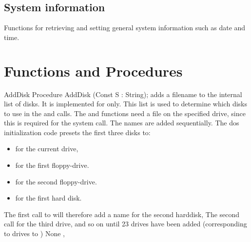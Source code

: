 \subsection{System information}
Functions for retrieving and setting general system information such as date
and time.
\begin{funclist}
\end{funclist}

\section{Functions and Procedures}
\begin{procedure}{AddDisk}
\Declaration
Procedure AddDisk (Const S : String);
\Description
{} adds a filename  to the internal list of disks. It is
implemented for \linux only.
 This list is used to determine which disks to use in the 
and  calls. 
The  and  functions need a file on the 
specified drive, since this is required for the  system call.
The names are added sequentially. The dos
initialization code presets the first three disks to:
\begin{itemize}
\item {} for the current drive, 
\item {} for the first floppy-drive.
\item {} for the second floppy-drive.
\item {} for the first hard disk.
\end{itemize}
The first call to  will therefore add a name for the second
harddisk, The second call for the third drive, and so on until 23 drives
have been added (corresponding to drives  to )
\Errors
None
\SeeAlso
{},  
\end{procedure}


